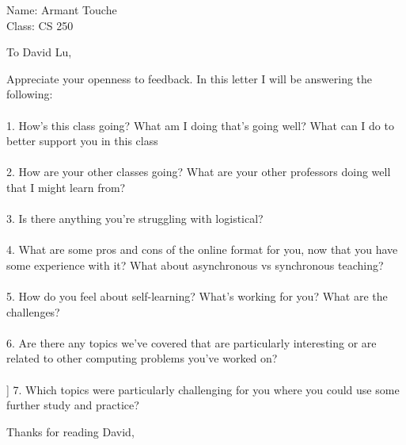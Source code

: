 \documentclass{letter}
\begin{document}
\begin{letter}{Name: Armant Touche \\ Class: CS 250 
\\ }
\opening{To David Lu,}

Appreciate your openness to feedback. In this letter I will be answering the following:\\\\
1. How's this class going?  What am I doing that's going well?  What can I do to better support you in this class\\\\
2. How are your other classes going?  What are your other professors doing well that I might learn from?\\\\
3. Is there anything you're struggling with logistical?\\\\
4. What are some pros and cons of the online format for you, now that you have some experience with it?  What about asynchronous vs synchronous teaching?\\\\
5. How do you feel about self-learning?  What's working for you?  What are the challenges?\\\\
6. Are there any topics we've covered that are particularly interesting or are related to other computing problems you've worked on?\\\\]
7.  Which topics  were  particularly  challenging  for  you  where  you  could  use  some  further study and practice?


\closing{Thanks for reading David,}

\end{letter}
\end{document}
